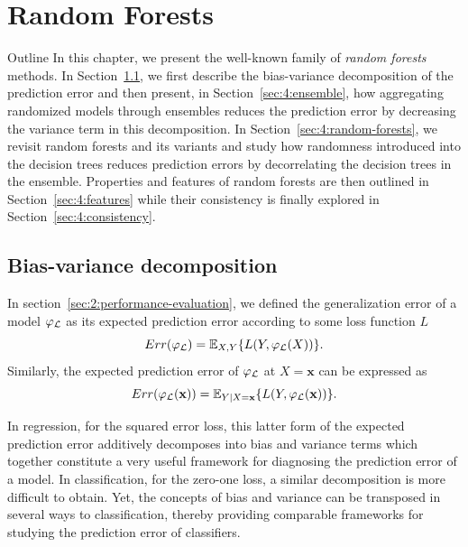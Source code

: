 \chapter{Random Forests}\label{ch:forest}

\begin{remark}{Outline}
In this chapter, we present the well-known family of \textit{random forests}
methods. In Section~\ref{sec:4:bias-variance}, we first describe the bias-variance
decomposition of the prediction error and then present, in
Section~\ref{sec:4:ensemble}, how aggregating randomized models through
ensembles reduces the prediction error by decreasing the variance term in this
decomposition. In Section~\ref{sec:4:random-forests}, we revisit random forests
and its variants and study how randomness introduced into the decision trees
reduces prediction errors by decorrelating the decision
trees in the ensemble. Properties and features of random forests are then outlined
in Section~\ref{sec:4:features} while their consistency
is finally explored in Section~\ref{sec:4:consistency}.
\end{remark}


\section{Bias-variance decomposition}
\label{sec:4:bias-variance}

In section~\ref{sec:2:performance-evaluation}, we defined the generalization
error of a model $\varphi_{\cal L}$ as its expected prediction error
according to some loss function $L$
\begin{equation}\label{eqn:4:generalization-error}
Err(\varphi_{\cal L}) = \mathbb{E}_{X,Y} \{ L(Y, \varphi_{\cal L}(X)) \}.
\end{equation}
Similarly, the expected prediction error of $\varphi_{\cal L}$ at $X=\mathbf{x}$
can be expressed as
\begin{equation}
Err(\varphi_{\cal L}(\mathbf{x})) = \mathbb{E}_{Y|X=\mathbf{x}} \{ L(Y, \varphi_{\cal L}(\mathbf{x})) \}.\label{eqn:4:generalization-error:x}
\end{equation}

In regression, for the squared error loss, this latter form of the expected
prediction error additively decomposes into bias and variance terms which
together constitute a very useful framework for diagnosing the prediction error
of a model. In classification, for the zero-one loss, a similar decomposition
is more difficult to obtain. Yet, the concepts of bias and variance can be
transposed in several ways to classification, thereby providing comparable
frameworks for studying the prediction error of classifiers.


